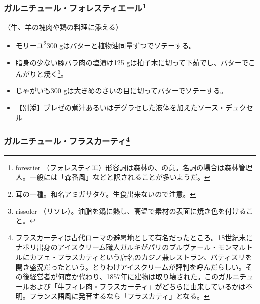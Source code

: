 \begin{recette}
\atoaki{}

\hypertarget{garniture-a-la-Forestiere}{%
\subsubsection[ガルニチュール・フォレスティエール]{\texorpdfstring{ガルニチュール・フォレスティエール\footnote{forestier
  （フォレスティエ）形容詞は森林の、の意。名詞の場合は森林管理人。一般には「森番風」などと訳されることが多いようだ。}}{ガルニチュール・フォレスティエール}}\label{garniture-a-la-Forestiere}}



（牛、羊の塊肉や鶏の料理に添える）

\begin{itemize}
\item
  モリーユ\footnote{茸の一種。和名アミガサタケ。生食出来ないので注意。}300
  gはバターと植物油同量ずつでソテーする。
\item
  脂身の少ない豚バラ肉の塩漬け125
  gは拍子木に切って下茹でし、バターでこんがりと焼く\footnote{rissoler
    （リソレ）。油脂を鍋に熱し、高温で素材の表面に焼き色を付けること。}。
\item
  じゃがいも300 gは大きめのさいの目に切ってバターでソテーする。
\item
  【別添】ブレゼの煮汁あるいはデグラセした液体を加えた\protect\hyperlink{sauce-duxelles}{ソース・デュクセル}
\end{itemize}

\atoaki{}

\hypertarget{garniture-frascati}{%
\subsubsection[ガルニチュール・フラスカーティ]{\texorpdfstring{ガルニチュール・フラスカーティ\footnote{フラスカーティは古代ローマの避暑地として有名だったところ。18世紀末にナポリ出身のアイスクリーム職人ガルキがパリのブルヴァール・モンマルトルにカフェ・フラスカティという店名のカジノ兼レストラン、パティスリを開き盛況だったという。とりわけアイスクリームが評判を呼んだらしい。その後経営者が何度か代わり、1857年に建物は取り壊された。このガルニチュールおよび「牛フィレ肉・フラスカーティ」がどちらに由来しているかは不明。フランス語風に発音するなら「フラスカティ」となる。}}{ガルニチュール・フラスカーティ}}\label{garniture-frascati}}


\end{recette}
